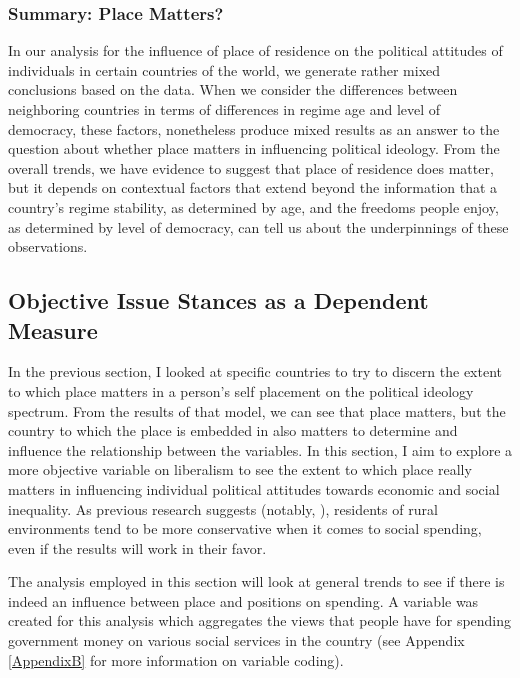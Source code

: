 \documentclass[12pt, titlepage]{article}
\begin{document}
\subsubsection{Summary: Place Matters?}

In our analysis for the influence of place of residence on the political attitudes of individuals in certain countries of the world, we generate rather mixed conclusions based on the data. When we consider the differences between neighboring countries in terms of differences in regime age and level of democracy, these factors, nonetheless produce mixed results as an answer to the question about whether place matters in influencing political ideology. From the overall trends, we have evidence to suggest that place of residence does matter, but it depends on contextual factors that extend beyond the information that a country's regime stability, as determined by age, and the freedoms people enjoy, as determined by level of democracy, can tell us about the underpinnings of these observations.

\subsection{Objective Issue Stances as a Dependent Measure}

In the previous section, I looked at specific countries to try to discern the extent to which place matters in a person's self placement on the political ideology spectrum. From the results of that model, we can see that place matters, but the country to which the place is embedded in also matters to determine and influence the relationship between the variables. In this section, I aim to explore a more objective variable on liberalism to see the extent to which place really matters in influencing individual political attitudes towards economic and social inequality. As previous research suggests (notably, \cite{walsh_putting_2012}), residents of rural environments tend to be more conservative when it comes to social spending, even if the results will work in their favor. 

The analysis employed in this section will look at general trends to see if there is indeed an influence between place and positions on spending. A variable was created for this analysis which aggregates the views that people have for spending government money on various social services in the country (see Appendix \ref{AppendixB} for more information on variable coding). 
\end{document}
